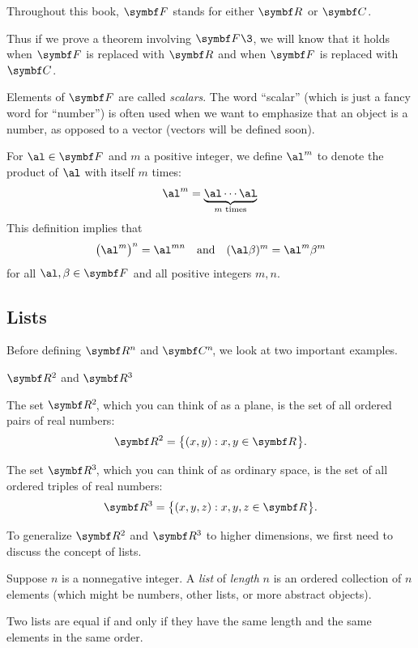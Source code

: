 \NotationBox{}
{
Throughout this book,
$\F{}$ stands for either $\R{}$ or $\C{}$.}


Thus if we prove a theorem involving $\F{}\3$, we will know that it
holds when $\F{}$ is replaced with $\R{}$ and when $\F{}$ is replaced with $\C{}$.

Elements of $\F{}$ are called \emph{scalars}.  The word
``scalar'' (which is just a fancy word for ``number'') is often used when we want to emphasize that
an object is a number, as opposed to a vector (vectors will be defined soon).

For $\al \in \F{}$ and $m$ a positive integer, we define $\al^m$ to denote the
product of $\al$ with itself $m$ times:
\[
\al^m = \underbrace{\al \cdots \al}_{m \text{ times}}\!\!.
\]
This definition implies that
\[
\paren[\big]{\al^m}^n = \al^{mn} \andd (\al \beta)^m = \al^m \beta^m
\]
for all $\al, \beta \in \F{}$ and all positive integers $m, n$.

\pagebreak[3]

\subsection{Lists}

Before defining $\R{n}$ and $\CC{n}$, we look at two important examples.

\begin{example}{$\R{2}$ and\/ $\R{3}$}
\begin{Itemize}
\item
The set $\RR{2}$, which you can think of as a plane, is the set of all ordered pairs of real numbers:
\[
\R{2} = \br[\big]{(x,y): x, y \in \R{} }.
\]
\item
The set $\RR{3}$, which you can think of as ordinary space,
is the set of all ordered triples of real numbers:
\[
\R{3} = \br[\big]{(x,y, z): x, y, z \in \R{} }.
\]
\end{Itemize}
\vspace{-.12in}
\end{example}

To generalize $\R{2}$ and $\R{3}$ to higher dimensions, we first need
to discuss the concept of lists.

{\begin{Itemize}
\item
Suppose $n$ is a nonnegative integer.  A \emph{list} of \emph{length} $n$ is an ordered collection of $n$ elements (which might be numbers, other lists, or more abstract objects).
\item
Two lists are equal if and only if they have the same length and the same elements in the same order.
\end{Itemize}}

